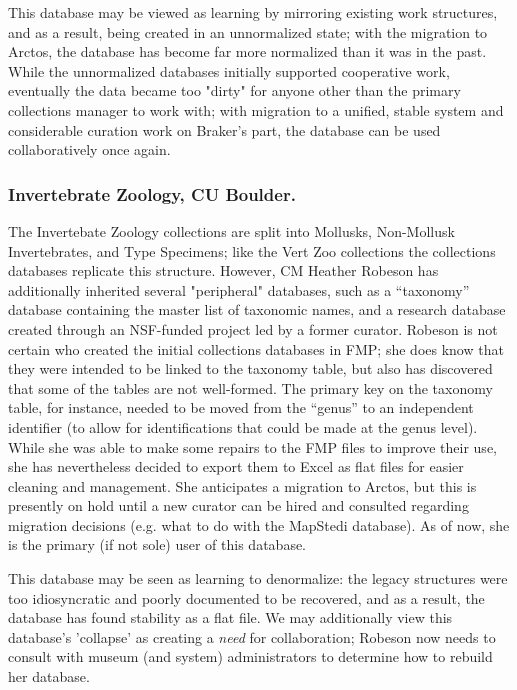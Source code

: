 This database may be viewed as learning by mirroring existing work structures, and as a result, being created in an unnormalized state; with the migration to Arctos, the database has become far more normalized than it was in the past. While the unnormalized databases initially supported cooperative work, eventually the data became too "dirty" for anyone other than the primary collections manager to work with; with migration to a unified, stable system and considerable curation work on Braker's part, the database can be used collaboratively once again.

\subsubsection{Invertebrate Zoology, CU Boulder.}

The Invertebate Zoology collections are split into Mollusks, Non-Mollusk Invertebrates, and Type Specimens; like the Vert Zoo collections the collections databases replicate this structure. However, CM Heather Robeson has additionally inherited several "peripheral" databases, such as a “taxonomy” database containing the master list of taxonomic names, and a research database created through an NSF-funded project led by a former curator. Robeson is not certain who created the initial collections databases in FMP; she does know that they were intended to be linked to the taxonomy table, but also has discovered that some of the tables are not well-formed. The primary key on the taxonomy table, for instance, needed to be moved from the “genus” to an independent identifier (to allow for identifications that could be made at the genus level). While she was able to make some repairs to the FMP files to improve their use, she has nevertheless decided to export them to Excel as flat files for easier cleaning and management.  She anticipates a migration to Arctos, but this is presently on hold until a new curator can be hired and consulted regarding migration decisions (e.g. what to do with the MapStedi database).  As of now, she is the primary (if not sole) user of this database.

This database may be seen as learning to denormalize: the legacy structures were too idiosyncratic and poorly documented to be recovered, and as a result, the database has found stability as a flat file. We may additionally view this database's 'collapse' as creating a \textit{need} for collaboration; Robeson now needs to consult with museum (and system) administrators to determine how to rebuild her database.

